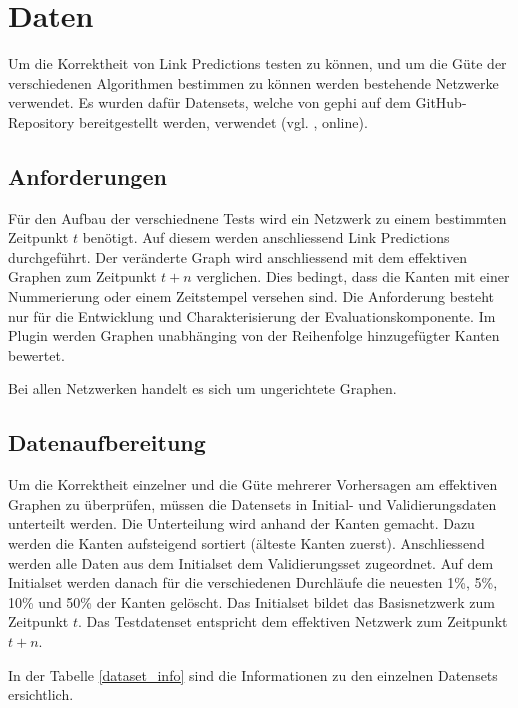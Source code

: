 \chapter{Daten}
\label{daten}
Um die Korrektheit von Link Predictions testen zu können, und um die Güte der verschiedenen Algorithmen bestimmen zu können werden bestehende Netzwerke verwendet.
Es wurden dafür Datensets, welche von \acs{gephi} auf dem GitHub-Repository bereitgestellt werden, verwendet (vgl. \citeauthor{moll_datasets_2018} \citeyear{moll_datasets_2018}, online).

\section{Anforderungen}
Für den Aufbau der verschiednene Tests wird ein Netzwerk zu einem bestimmten Zeitpunkt $t$ benötigt.
Auf diesem werden anschliessend Link Predictions durchgeführt.
Der veränderte Graph wird anschliessend mit dem effektiven Graphen zum Zeitpunkt $t + n$ verglichen.
Dies bedingt, dass die Kanten mit einer Nummerierung oder einem Zeitstempel versehen sind.
Die Anforderung besteht nur für die Entwicklung und Charakterisierung der Evaluationskomponente.
Im Plugin werden Graphen unabhänging von der Reihenfolge hinzugefügter Kanten bewertet.

Bei allen Netzwerken handelt es sich um ungerichtete Graphen.

\section{Datenaufbereitung}
Um die Korrektheit einzelner und die Güte mehrerer Vorhersagen am effektiven Graphen zu überprüfen, müssen die Datensets in Initial- und Validierungsdaten unterteilt werden.
Die Unterteilung wird anhand der Kanten gemacht. Dazu werden die Kanten aufsteigend sortiert (älteste Kanten zuerst).
Anschliessend werden alle Daten aus dem Initialset dem Validierungsset zugeordnet. Auf dem Initialset werden danach für die verschiedenen Durchläufe die neuesten 1\%, 5\%, 10\% und 50\% der Kanten gelöscht. Das Initialset bildet das Basisnetzwerk zum Zeitpunkt $t$.
Das Testdatenset entspricht dem effektiven Netzwerk zum Zeitpunkt $t + n$.

In der Tabelle \ref{dataset_info} sind die Informationen zu den einzelnen Datensets ersichtlich.

